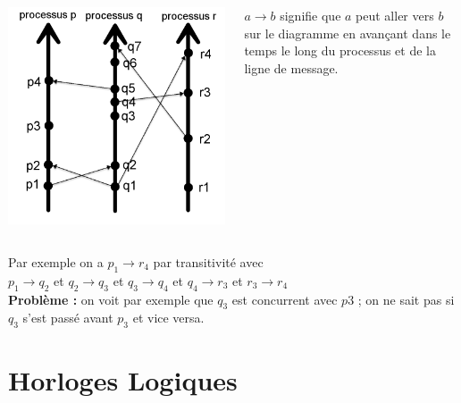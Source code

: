 \documentclass[compress]{beamer}
\begin{document}
\begin{frame}
  \begin{columns}
    \begin{column}{.5\textwidth}
		\includegraphics[scale=0.15]{process2.png}
    \end{column}
	\begin{column}{0.5 \textwidth}
		$a \rightarrow b$ signifie que $a$ peut aller vers $b$ sur le diagramme en avançant dans le temps le long du processus et de la ligne de message.
	\end{column}
	\end{columns}
	Par exemple on a $p_1 \rightarrow r_4$  par transitivité avec \\
	$p_1 \rightarrow q_2$ et $q_2 \rightarrow q_3$ et $q_3 \rightarrow q_4$ et $q_4 \rightarrow r_3$ et $r_3 \rightarrow r_4$\\
	\textbf{{\color{red}Problème : }}on voit par exemple que $q_3$ est concurrent avec $p3$ ; on ne sait pas si $q_3$ s'est passé avant $p_3$ et vice versa.
\end{frame}

\section{Horloges Logiques}
\end{document}
